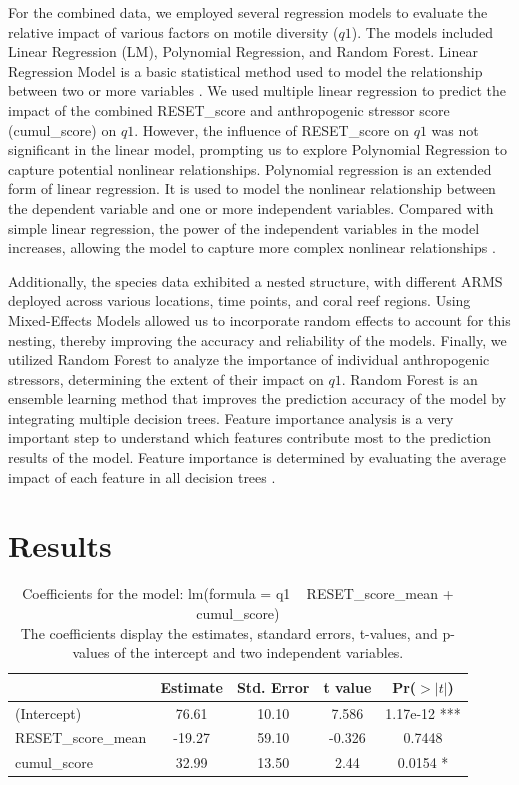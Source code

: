 \documentclass[a4paper, 11]{article}
\begin{document}
For the combined data, we employed several regression models to evaluate the relative impact of various factors on motile diversity (\( q1 \)). The models included Linear Regression (LM), Polynomial Regression, and Random Forest. Linear Regression Model is a basic statistical method used to model the relationship between two or more variables \citep{montgomery2021introduction}. We used multiple linear regression to predict the impact of the combined RESET\_score and anthropogenic stressor score (cumul\_score) on \( q1 \). However, the influence of RESET\_score on \( q1 \) was not significant in the linear model, prompting us to explore Polynomial Regression to capture potential nonlinear relationships. Polynomial regression is an extended form of linear regression. It is used to model the nonlinear relationship between the dependent variable and one or more independent variables. Compared with simple linear regression, the power of the independent variables in the model increases, allowing the model to capture more complex nonlinear relationships \citep{seber2012linear}.

Additionally, the species data exhibited a nested structure, with different ARMS deployed across various locations, time points, and coral reef regions. Using Mixed-Effects Models allowed us to incorporate random effects to account for this nesting, thereby improving the accuracy and reliability of the models. Finally, we utilized Random Forest to analyze the importance of individual anthropogenic stressors, determining the extent of their impact on \( q1 \). Random Forest is an ensemble learning method that improves the prediction accuracy of the model by integrating multiple decision trees. Feature importance analysis is a very important step to understand which features contribute most to the prediction results of the model. Feature importance is determined by evaluating the average impact of each feature in all decision trees \citep{breiman2001random}.\\

\section{Results}

\begin{table}[H]
\centering
\begin{tabular}{lcccc}
\toprule
 & Estimate & Std. Error & t value & Pr($>|t|$) \\
\midrule
(Intercept) & 76.61 & 10.10 & 7.586 & 1.17e-12 *** \\
RESET\_score\_mean & -19.27 & 59.10 & -0.326 & 0.7448 \\
cumul\_score & 32.99 & 13.50 & 2.44 & 0.0154 * \\
\bottomrule
\end{tabular}
\caption{Coefficients for the model: lm(formula = q1 ~ RESET\_score\_mean + cumul\_score) \\
The coefficients display the estimates, standard errors, t-values, and p-values of the intercept and two independent variables.}
\label{tab:model1}
\end{table}
\end{document}
